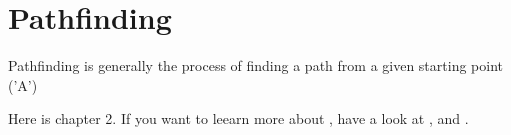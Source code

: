 \chapter{Pathfinding}\label{ch:path}
Pathfinding is generally the process of finding a path from a given starting point ('A')

Here is chapter 2. If you want to leearn  more about \LaTeXe{}, have a look at \cite{Madsen2010}, \cite{Oetiker2010} and \cite{Mittelbach2005}.
